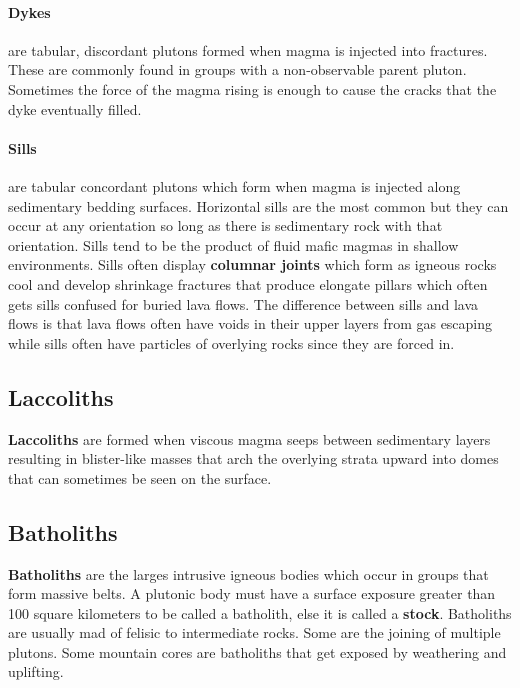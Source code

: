 \documentclass{article}
\begin{document}
\paragraph{Dykes} %
\label{par:dykes}
are tabular, discordant plutons formed when magma is injected into fractures. These are commonly found in groups with a non-observable parent pluton. Sometimes the force of the magma rising is enough to cause the cracks that the dyke eventually filled.
\paragraph{Sills} %
\label{par:sills}
are tabular concordant plutons which form when magma is injected along sedimentary bedding surfaces. Horizontal sills are the most common but they can occur at any orientation so long as there is sedimentary rock with that orientation. Sills tend to be the product of fluid mafic magmas in shallow environments. Sills often display \textbf{columnar joints} which form as igneous rocks cool and develop shrinkage fractures that produce elongate pillars which often gets sills confused for buried lava flows. The difference between sills and lava flows is that lava flows often have voids in their upper layers from gas escaping while sills often have particles of overlying rocks since they are forced in.


\subsection{Laccoliths} %
\label{sub:laccoliths}
\textbf{Laccoliths} are formed when viscous magma seeps between sedimentary layers resulting in blister-like masses that arch the overlying strata upward into domes that can sometimes be seen on the surface.

\subsection{Batholiths} %
\label{sub:batholiths}
\textbf{Batholiths} are the larges intrusive igneous bodies which occur in groups that form massive belts. A plutonic body must have a surface exposure greater than 100 square kilometers to be called a batholith, else it is called a \textbf{stock}. Batholiths are usually mad of felisic to intermediate rocks. Some are the joining of multiple plutons. Some mountain cores are batholiths that get exposed by weathering and uplifting.
\end{document}
